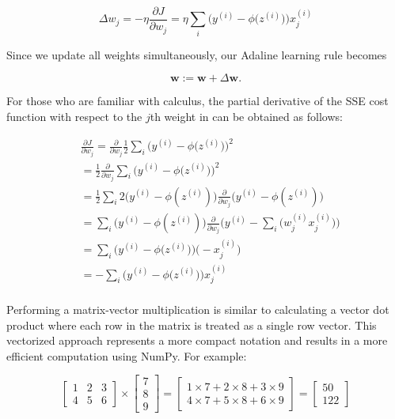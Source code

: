 \documentclass[letterpaper]{report}
\begin{document}
\[
\Delta w_j = - \eta \frac{\partial J}{\partial w_j} = \eta  \sum_i \bigg( y^{(i)} - \phi \big(z^{(i)} \big) \bigg) x_{j}^{(i)}
\]

Since we update all weights simultaneously, our Adaline learning rule becomes

\[
\mathbf{w} := \mathbf{w} + \Delta \mathbf{w}.
\]


For those who are familiar with calculus, the partial derivative of the SSE cost function with respect to the $j$th weight in can be obtained as follows:

\begin{equation*} 
\begin{split}
& \frac{\partial J}{\partial w_j} = \frac{\partial}{\partial w_j} \frac{1}{2} \sum_i \bigg(  y^{(i)} - \phi \big( z^{(i)} \big)  \bigg)^2 \\
& = \frac{1}{2} \frac{\partial}{\partial w_j} \sum_i \bigg(  y^{(i)} - \phi \big( z^{(i)} \big)  \bigg)^2 \\
& = \frac{1}{2} \sum_i 2 \big( y^{(i)} - \phi(z^{(i)})\big)  \frac{\partial}{\partial w_j} \Big( y^{(i)}  - \phi({z^{(i)}}) \Big) \\
& = \sum_i \big( y^{(i)}  - \phi (z^{(i)})   \big) \frac{\partial}{\partial w_j} \Big( y^{(i)} - \sum_i \big(w^{(i)}_{j} x^{(i)}_{j} \big) \Big) \\
& = \sum_i \bigg(  y^{(i)} - \phi \big( z^{(i)} \big)  \bigg) \bigg( - x_{j}^{(i)} \bigg) \\
& = - \sum_i \bigg(  y^{(i)} - \phi \big( z^{(i)} \big)  \bigg) x_{j}^{(i)}  \\
\end{split}
\end{equation*}

Performing a matrix-vector multiplication is similar to calculating a vector dot product where each row in the matrix is treated as a single row vector. This vectorized approach represents a more compact notation and results in a more efficient computation using NumPy. For example:

\[
 \begin{bmatrix}
    1 & 2  & 3\\
    4 & 5  & 6
\end{bmatrix} \times  \begin{bmatrix}
    7 \\
    8 \\
    9
\end{bmatrix} =  \begin{bmatrix}
    1 \times 7 + 2 \times 8 + 3 \times 9 \\
    4 \times 7 + 5 \times 8 + 6 \times 9
\end{bmatrix} = \begin{bmatrix}
    50 \\
    122
\end{bmatrix}
\]
\end{document}
